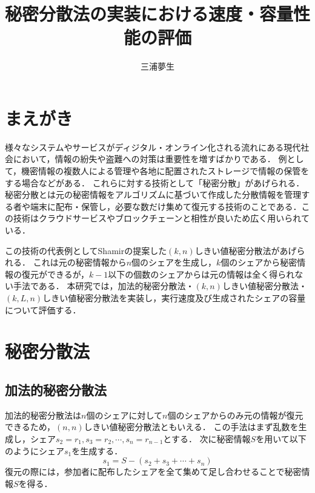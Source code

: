 \documentclass[twocolumn]{jarticle}
\begin{document}
\pagestyle{empty}

\date{}  %
\title{秘密分散法の実装における速度・容量性能の評価}
\author{三浦夢生}
\maketitle

\suppressfloats[t]


\section{まえがき}
様々なシステムやサービスがディジタル・オンライン化される流れにある現代社会において，情報の紛失や盗難への対策は重要性を増すばかりである．
%
例として，機密情報の複数人による管理や各地に配置されたストレージで情報の保管をする場合などがある．
%
これらに対する技術として「秘密分散」があげられる．
%
秘密分散とは元の秘密情報をアルゴリズムに基づいて作成した分散情報を管理する者や端末に配布・保管し，必要な数だけ集めて復元する技術のことである．この技術はクラウドサービスやブロックチェーンと相性が良いため広く用いられている．

この技術の代表例としてShamirの提案した$(k,n)$しきい値秘密分散法\cite{shamir}があげられる．
%
これは元の秘密情報から$n$個のシェアを生成し，$k$個のシェアから秘密情報の復元ができるが，$k-1$以下の個数のシェアからは元の情報は全く得られない手法である．
%
本研究では，加法的秘密分散法\cite{oohara}・$(k,n)$しきい値秘密分散法\cite{shamir}・$(k,L,n)しきい値秘密分散法$\cite{yamamoto}\cite{multiparty}を実装し，実行速度及び生成されたシェアの容量について評価する．


\section{秘密分散法}
\subsection{加法的秘密分散法\cite{oohara}}
加法的秘密分散法は$n$個のシェアに対して$n$個のシェアからのみ元の情報が復元できるため，$(n,n)$しきい値秘密分散法ともいえる．
%
この手法はまず乱数を生成し，シェア$s_{2}=r_{1},s_{3}=r_{2},{\cdots},s_{n}=r_{n-1}$とする．
%
次に秘密情報$S$を用いて以下のようにシェア$s_{1}$を生成する．
%
\begin{equation}
	s_{1}=S-(s_{2}+s_{3}+{\cdots}+s_{n})
\end{equation}
%
復元の際には，参加者に配布したシェアを全て集めて足し合わせることで秘密情報$S$を得る．
\end{document}
